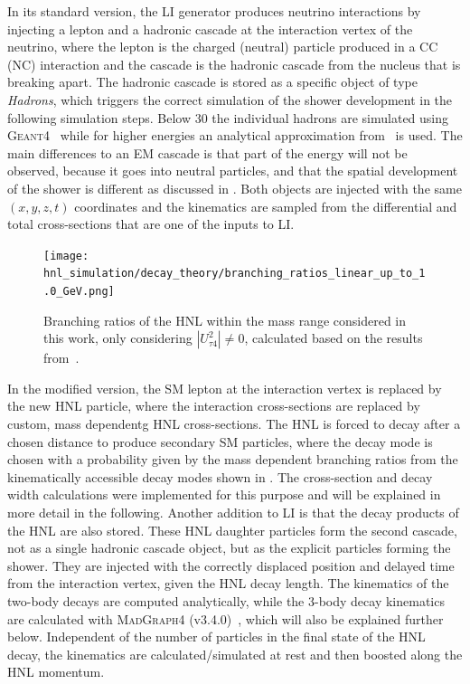 In its standard version, the LI generator produces neutrino interactions by injecting a lepton and a hadronic cascade at the interaction vertex of the neutrino, where the lepton is the charged (neutral) particle produced in a CC (NC) interaction and the cascade is the hadronic cascade from the nucleus that is breaking apart. The hadronic cascade is stored as a specific object of type \textit{Hadrons}, which triggers the correct simulation of the shower development in the following simulation steps. Below \SI{30}{\gev} the individual hadrons are simulated using \textsc{Geant4}~ while for higher energies an analytical approximation from~\cite{raedel_wiebusch_cherenkov_yield} is used. The main differences to an EM cascade is that part of the energy will not be observed, because it goes into neutral particles, and that the spatial development of the shower is different as discussed in . Both objects are injected with the same $(x,y,z,t)$ coordinates and the kinematics are sampled from the differential and total cross-sections that are one of the inputs to LI.

\begin{figure}[h]
    \texttt{[image: hnl\_simulation/decay\_theory/branching\_ratios\_linear\_up\_to\_1.0\_GeV.png]}
    \caption[HNL branching ratios]{Branching ratios of the HNL within the mass range considered in this work, only considering $|U_{\tau4}^2| \neq 0$, calculated based on the results from~\cite{Coloma:2020lgy}.}
\end{figure}

In the modified version, the SM lepton at the interaction vertex is replaced by the new HNL particle, where the interaction cross-sections are replaced by custom, mass dependentg HNL cross-sections. The HNL is forced to decay after a chosen distance to produce secondary SM particles, where the decay mode is chosen with a probability given by the mass dependent branching ratios from the kinematically accessible decay modes shown in . The cross-section and decay width calculations were implemented for this purpose and will be explained in more detail in the following. Another addition to LI is that the decay products of the HNL are also stored. These HNL daughter particles form the second cascade, not as a single hadronic cascade object, but as the explicit particles forming the shower. They are injected with the correctly displaced position and delayed time from the interaction vertex, given the HNL decay length. The kinematics of the two-body decays are computed analytically, while the 3-body decay kinematics are calculated with \textsc{MadGraph4} (v3.4.0)~\cite{madgraph4}, which will also be explained further below. Independent of the number of particles in the final state of the HNL decay, the kinematics are calculated/simulated at rest and then boosted along the HNL momentum.

